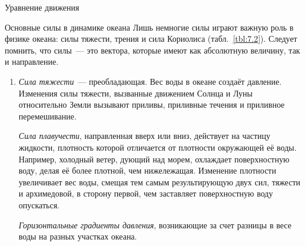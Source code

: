 \begin{chapter}{Уравнение движения}
\begin{section}{Основные силы в динамике океана}
Лишь немногие силы играют важную роль в физике океана: силы тяжести, трения
и сила Кориолиса (табл.~\ref{tbl:7.2}). Следует помнить, что силы~--- это 
вектора, которые имеют как абсолютную величину, так и направление.
%
%
\begin{enumerate}
\item
\emph{Сила тяжести}~--- преобладающая. Вес воды в океане создаёт давление.
Изменения силы тяжести, вызванные движением Солнца и Луны относительно Земли 
вызывают приливы, приливные течения и приливное перемешивание.
%

\emph{Сила плавучести}, направленная вверх или вниз, действует 
на частицу жидкости, плотность которой отличается от плотности окружающей 
её воды. Например, холодный ветер, дующий над
морем, охлаждает поверхностную воду, делая её более плотной, чем 
нижележащая. Изменение плотности увеличивает вес воды, смещая тем самым
результирующую двух сил, тяжести и архимедовой, в сторону первой,
чем заставляет поверхностную воду опускаться.
%

\emph{Горизонтальные градиенты давления}, возникающие за счет разницы в
весе воды на разных участках океана.
%


\end{enumerate}
\end{section}
\end{chapter}
